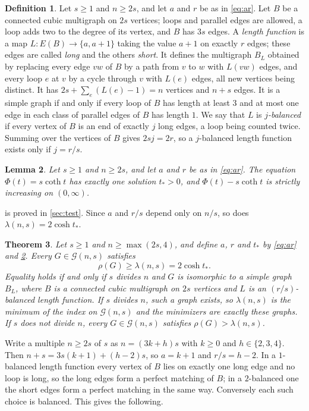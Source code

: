 \documentclass[11pt]{article}
\newtheorem{theorem}{Theorem}
\newtheorem{lemma}[theorem]{Lemma}
\theoremstyle{definition}
\newtheorem{definition}[theorem]{Definition}
\theoremstyle{remark}
\newcommand{\G}{\mathcal{G}}
\begin{document}
\begin{definition}\label{def:balanced}
Let $s\ge1$ and $n\ge2s$, and let $a$ and $r$ be as in \eqref{eq:ar}. Let $B$ be a connected cubic multigraph on $2s$
vertices; loops and parallel edges are allowed, a loop adds two to the degree of its vertex, and $B$ has $3s$ edges. A
\emph{length function} is a map $L\colon E(B)\to\{a,a+1\}$ taking the value $a+1$ on exactly $r$ edges; these edges are
called \emph{long} and the others \emph{short}. It defines the multigraph $B_L$ obtained by replacing every edge $vw$ of
$B$ by a path from $v$ to $w$ with $L(vw)$ edges, and every loop $e$ at $v$ by a cycle through $v$ with $L(e)$ edges,
all new vertices being distinct. It has $2s+\sum_e(L(e)-1)=n$ vertices and $n+s$ edges. It is a simple graph if and
only if every loop of $B$ has length at least $3$ and at most one edge in each class of parallel edges of $B$ has
length $1$. We say that $L$ is \emph{$j$-balanced} if every vertex of $B$ is an end of exactly $j$ long edges, a loop
being counted twice. Summing over the vertices of $B$ gives $2sj=2r$, so a $j$-balanced length function exists only if
$j=r/s$.
\end{definition}

\begin{lemma}\label{lem:tstar}
Let $s\ge1$ and $n\ge2s$, and let $a$ and $r$ be as in \eqref{eq:ar}. The equation $\Phi(t)=s\coth t$ has exactly one solution $t_*>0$, and $\Phi(t)-s\coth t$ is strictly increasing on
$(0,\infty)$.
\end{lemma}

 is proved in \cref{sec:test}. Since $a$ and $r/s$ depend only on $n/s$, so does
$\lambda(n,s)=2\cosh t_*$.

\begin{theorem}\label{thm:main}
Let $s\ge1$ and $n\ge\max(2s,4)$, and define $a$, $r$ and $t_*$ by \eqref{eq:ar} and \cref{lem:tstar}. Every
$G\in\G(n,s)$ satisfies
\[
\rho(G)\ge\lambda(n,s)=2\cosh t_* .
\]
Equality holds if and only if $s$ divides $n$ and $G$ is isomorphic to a simple graph $B_L$, where $B$ is a connected
cubic multigraph on $2s$ vertices and $L$ is an $(r/s)$-balanced length function. If $s$ divides $n$, such a graph
exists, so $\lambda(n,s)$ is the minimum of the index on $\G(n,s)$ and the minimizers are exactly these graphs. If $s$
does not divide $n$, every $G\in\G(n,s)$ satisfies $\rho(G)>\lambda(n,s)$.
\end{theorem}

Write a multiple $n\ge2s$ of $s$ as $n=(3k+h)s$ with $k\ge0$ and $h\in\{2,3,4\}$. Then $n+s=3s(k+1)+(h-2)s$, so
$a=k+1$ and $r/s=h-2$. In a $1$-balanced length function every vertex of $B$ lies on exactly one long edge and no loop
is long, so the long edges form a perfect matching of $B$; in a $2$-balanced one the short edges form a perfect matching
in the same way. Conversely each such choice is balanced. This gives the following.
\end{document}
